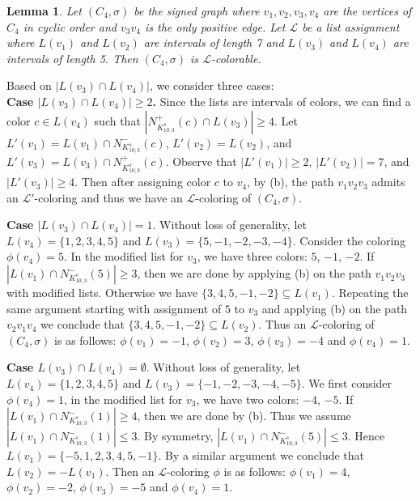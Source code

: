 \documentclass[11pt,a4paper]{article}
\makeatletter
\renewenvironment{proof}[1][\proofname]{\par
	\pushQED{\qed}%
	\normalfont \topsep6\p@\@plus6\p@\relax
	\trivlist
	\item[\hskip\labelsep
	\bfseries
	#1\@addpunct{.}]\ignorespaces
}{%
	\popQED\endtrivlist\@endpefalse
}
\newtheorem{lemma}[theorem]{Lemma}
\theoremstyle{definition}
\makeatother
\begin{document}
	

	
	
	
	\begin{lemma}\label{lem:4-cycle}
		Let $(C_4, \sigma)$ be the signed graph where $v_{1}, v_{2}, v_{3}, v_{4}$ are the vertices of $C_4$ in cyclic order and $v_{3}v_{4}$ is the only positive edge. Let $\mathcal{L}$ be a list assignment where $L(v_{1})$ and $L(v_{2})$ are intervals of length 7 and  $L(v_{3})$ and $L(v_{4})$ are intervals of length 5. Then $(C_4, \sigma)$ is $\mathcal{L}$-colorable.
	\end{lemma}
	
	
	
	
	\begin{proof}
		Based on $|L(v_{3})\cap L(v_{4})|$, we consider three cases:\\
		{\bf Case $|L(v_{3})\cap L(v_{4})|\ge 2$.}
		Since the lists are intervals of colors, we can find a color  $c\in L(v_{4})$ such that $|N^{+}_{K_{10;3}^{s}}(c)\cap L(v_{3})|\ge 4$.
		Let $L'(v_{1})=L(v_{1})\cap N^{-}_{K_{10;3}^{s}}(c)$, $L'(v_{2})=L(v_{2})$, and $L'(v_{3})=L(v_{3})\cap N^{+}_{K_{10;3}^{s}}(c)$. Observe that  $|L'(v_{1})|\ge 2$, $|L'(v_{2})|=7$, and $|L'(v_{3})|\geq 4$.  Then after assigning color $c$ to $v_4$, by (b), the path $v_{1}v_{2}v_{3}$ admits an $\mathcal{L'}$-coloring and thus we have an $\mathcal{L}$-coloring of $(C_4, \sigma)$.   
		
		{\bf Case $|L(v_{3})\cap L(v_{4})|=1$}. Without loss of generality, let $L(v_{4})=\{1,2,3,4,5\}$ and $L(v_{3})=\{5,-1,-2,-3,-4\}$.  Consider the coloring $\phi(v_{4})=5$. In the modified list for $v_{3}$, we have three colors: $5$, $-1$, $-2$. If $|L(v_{1})\cap N^{-}_{K_{10;3}^{s}}(5)|\ge 3$, then we are done by applying (b) on the path $v_1v_2v_3$ with modified lists. Otherwise we have $\{3,4,5,-1,-2\} \subseteq L(v_{1})$. Repeating the same argument starting with assignment of $5$ to $v_3$ and applying (b) on the path $v_2v_1v_4$ we conclude that $\{3,4,5,-1,-2\} \subseteq L(v_{2})$. Thus an $\mathcal{L}$-coloring of $(C_4, \sigma)$ is as follows: $\phi(v_{1})=-1$, $\phi(v_{2})=3$, $\phi(v_{3})=-4$ and $\phi(v_{4})=1$.
		
		
		
		{\bf Case $L(v_{3})\cap L(v_{4})=\emptyset$}. Without loss of generality, let $L(v_{4})=\{1,2,3,4,5\}$ and $L(v_{3})=\{-1,-2,-3,-4,-5\}$.  We first consider $\phi(v_{4})=1$,  in the modified list for $v_{3}$, we have two colors: $-4$, $-5$. If $|L(v_{1})\cap N^{-}_{K_{10;3}^{s}}(1)|\ge 4$, then we are done by (b).  Thus we assume $|L(v_{1})\cap N^{-}_{K_{10;3}^{s}}(1)|\leq 3$. By symmetry, $|L(v_{1})\cap N^{-}_{K_{10;3}^{s}}(5)|\leq 3$. Hence $L(v_{1})=\{-5,1,2,3,4,5,-1\}$. By a similar argument we conclude that $L(v_{2})=-L(v_{1})$. Then an $\mathcal{L}$-coloring $\phi$  is as follows: $\phi(v_{1})=4$, $\phi(v_{2})=-2$, $\phi(v_{3})=-5$ and $\phi(v_{4})=1$.
	\end{proof}
	
\end{document}
